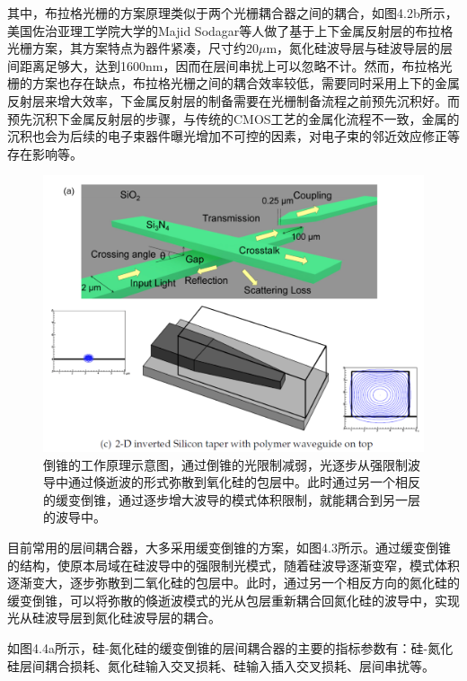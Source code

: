其中，布拉格光栅的方案原理类似于两个光栅耦合器之间的耦合，如图4.2b所示，美国佐治亚理工学院大学的Majid Sodagar等人做了基于上下金属反射层的布拉格光栅方案，其方案特点为器件紧凑，尺寸约20$\mu$m，氮化硅波导层与硅波导层的层间距离足够大，达到1600nm，因而在层间串扰上可以忽略不计\cite{Majid2014High}。然而，布拉格光栅的方案也存在缺点，布拉格光栅之间的耦合效率较低，需要同时采用上下的金属反射层来增大效率，下金属反射层的制备需要在光栅制备流程之前预先沉积好。而预先沉积下金属反射层的步骤，与传统的CMOS工艺的金属化流程不一致，金属的沉积也会为后续的电子束器件曝光增加不可控的因素，对电子束的邻近效应修正等存在影响等。


\begin{figure}[!htbp]
    \centering
    \includegraphics[width=1\textwidth]{Img/4-3.png}
    \caption{倒锥的工作原理示意图，通过倒锥的光限制减弱，光逐步从强限制波导中通过倏逝波的形式弥散到氧化硅的包层中。此时通过另一个相反的缓变倒锥，通过逐步增大波导的模式体积限制，就能耦合到另一层的波导中。\cite{Kuanping2015Low,Dirkgrating}}
    \label{fig:4-3}
\end{figure}

目前常用的层间耦合器，大多采用缓变倒锥的方案，如图4.3所示。通过缓变倒锥的结构，使原本局域在硅波导中的强限制光模式，随着硅波导逐渐变窄，模式体积逐渐变大，逐步弥散到二氧化硅的包层中。此时，通过另一个相反方向的氮化硅的缓变倒锥，可以将弥散的倏逝波模式的光从包层重新耦合回氮化硅的波导中，实现光从硅波导层到氮化硅波导层的耦合。\cite{Kuanping2015Low}

如图4.4a所示，硅-氮化硅的缓变倒锥的层间耦合器的主要的指标参数有：硅-氮化硅层间耦合损耗、氮化硅输入交叉损耗、硅输入插入交叉损耗、层间串扰等。

